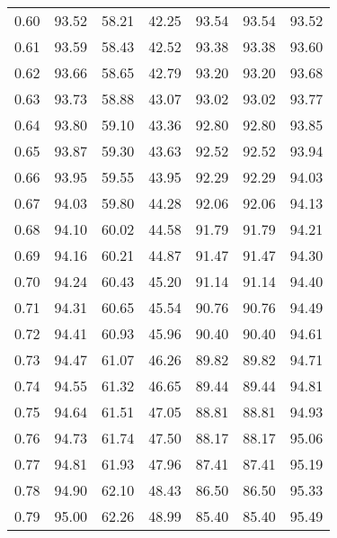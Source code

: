 \begin{tabular}{|c|c|c|c|c|c|c|}
      0.60 &     93.52 &     58.21 &      42.25 &   93.54 &      93.54 &         93.52 \\
      0.61 &     93.59 &     58.43 &      42.52 &   93.38 &      93.38 &         93.60 \\
      0.62 &     93.66 &     58.65 &      42.79 &   93.20 &      93.20 &         93.68 \\
      0.63 &     93.73 &     58.88 &      43.07 &   93.02 &      93.02 &         93.77 \\
      0.64 &     93.80 &     59.10 &      43.36 &   92.80 &      92.80 &         93.85 \\
      0.65 &     93.87 &     59.30 &      43.63 &   92.52 &      92.52 &         93.94 \\
      0.66 &     93.95 &     59.55 &      43.95 &   92.29 &      92.29 &         94.03 \\
      0.67 &     94.03 &     59.80 &      44.28 &   92.06 &      92.06 &         94.13 \\
      0.68 &     94.10 &     60.02 &      44.58 &   91.79 &      91.79 &         94.21 \\
      0.69 &     94.16 &     60.21 &      44.87 &   91.47 &      91.47 &         94.30 \\
      0.70 &     94.24 &     60.43 &      45.20 &   91.14 &      91.14 &         94.40 \\
      0.71 &     94.31 &     60.65 &      45.54 &   90.76 &      90.76 &         94.49 \\
      0.72 &     94.41 &     60.93 &      45.96 &   90.40 &      90.40 &         94.61 \\
      0.73 &     94.47 &     61.07 &      46.26 &   89.82 &      89.82 &         94.71 \\
      0.74 &     94.55 &     61.32 &      46.65 &   89.44 &      89.44 &         94.81 \\
      0.75 &     94.64 &     61.51 &      47.05 &   88.81 &      88.81 &         94.93 \\
      0.76 &     94.73 &     61.74 &      47.50 &   88.17 &      88.17 &         95.06 \\
      0.77 &     94.81 &     61.93 &      47.96 &   87.41 &      87.41 &         95.19 \\
      0.78 &     94.90 &     62.10 &      48.43 &   86.50 &      86.50 &         95.33 \\
      0.79 &     95.00 &     62.26 &      48.99 &   85.40 &      85.40 &         95.49 \\

\end{tabular}
